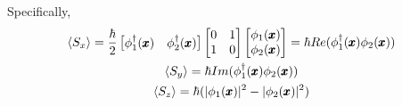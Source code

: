 Specifically, 
\begin{gather}
	\braket{S_x}=\frac{\hbar}{2} \begin{bmatrix}
		\phi^\dagger_1(\pmb{x})& \phi^\dagger_2(\pmb{x})
	\end{bmatrix} \begin{bmatrix}
		0&1\\
		1&0
	\end{bmatrix} \begin{bmatrix}
		\phi_1(\pmb{x})\\ \phi_2(\pmb{x})\end{bmatrix}=\hbar Re(\phi_1^\dagger(\pmb{x})\phi_2(\pmb{x}))\\
		\braket{S_y}=\hbar Im(\phi^\dagger_1(\pmb{x}) \phi_2(\pmb{x}))\\
		\braket{S_z}=\hbar (|\phi_1(\pmb{x})|^2-|\phi_2(\pmb{x})|^2)
\end{gather}
















